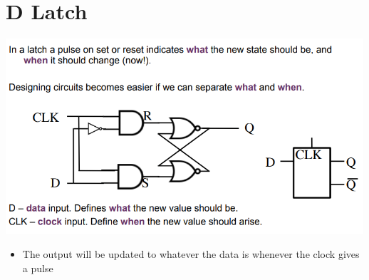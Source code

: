 \documentclass{article}[18pt]
\begin{document}
\section{D Latch}
\begin{center}
	\includegraphics[scale=0.7]{figure5}
\end{center}
\begin{itemize}
	\item The output will be updated to whatever the data is whenever the clock gives a pulse
\end{itemize}
\end{document}
